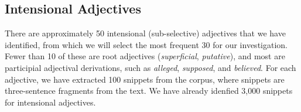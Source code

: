 \documentclass[10pt]{article}
\begin{document}
%
%
%
%
%


\vspace{-.1in}
\subsection{Intensional Adjectives}
\vspace {-3mm}

 
There are approximately 50 intensional (sub-selective) adjectives that we have identified, from which we will select the most frequent 30 for our investigation. Fewer than 10 of these are root adjectives ({\it superficial}, {\it putative}), and most are participial adjectival derivations, such as {\it alleged}, {\it supposed}, and {\it believed}. For each adjective, we have extracted 100 snippets from the corpus, where snippets are three-sentence fragments from the text. We have already idenfied 3,000 snippets for intensional adjectives. 
\end{document}
